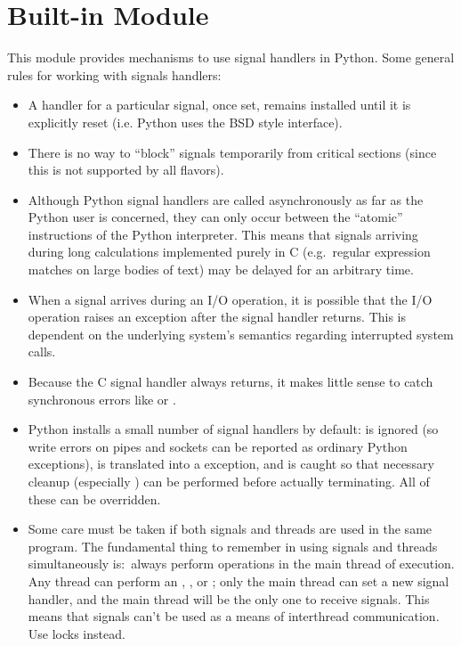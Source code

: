 \section{Built-in Module }

This module provides mechanisms to use signal handlers in Python.
Some general rules for working with signals handlers:

\begin{itemize}

\item
A handler for a particular signal, once set, remains installed until
it is explicitly reset (i.e. Python uses the BSD style interface).

\item
There is no way to ``block'' signals temporarily from critical
sections (since this is not supported by all \UNIX{} flavors).

\item
Although Python signal handlers are called asynchronously as far as
the Python user is concerned, they can only occur between the
``atomic'' instructions of the Python interpreter.  This means that
signals arriving during long calculations implemented purely in C
(e.g.\ regular expression matches on large bodies of text) may be
delayed for an arbitrary time.

\item
When a signal arrives during an I/O operation, it is possible that the
I/O operation raises an exception after the signal handler returns.
This is dependent on the underlying \UNIX{} system's semantics regarding
interrupted system calls.

\item
Because the C signal handler always returns, it makes little sense to
catch synchronous errors like  or .

\item
Python installs a small number of signal handlers by default:
 is ignored (so write errors on pipes and sockets can be
reported as ordinary Python exceptions),  is translated
into a  exception, and  is
caught so that necessary cleanup (especially ) can
be performed before actually terminating.  All of these can be
overridden.

\item
Some care must be taken if both signals and threads are used in the
same program.  The fundamental thing to remember in using signals and
threads simultaneously is:\ always perform  operations
in the main thread of execution.  Any thread can perform an
, , or ; only the main
thread can set a new signal handler, and the main thread will be the
only one to receive signals.  This means that signals can't be used as
a means of interthread communication.  Use locks instead.

\end{itemize}

